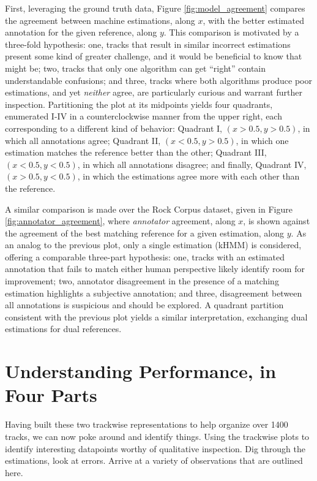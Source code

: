 \documentclass{article}
\begin{document}
First, leveraging the ground truth data, Figure \ref{fig:model_agreement} compares the agreement between machine estimations, along $x$, with the better estimated annotation for the given reference, along $y$.
This comparison is motivated by a three-fold hypothesis:
one, tracks that result in similar incorrect estimations present some kind of greater challenge, and it would be beneficial to know that might be;
two, tracks that only one algorithm can get ``right'' contain understandable confusions;
and three, tracks where both algorithms produce poor estimations, and yet \emph{neither} agree, are particularly curious and warrant further inspection.
Partitioning the plot at its midpoints yields four quadrants, enumerated I-IV in a counterclockwise manner from the upper right, each corresponding to a different kind of behavior:
Quadrant I, $(x > 0.5, y > 0.5)$, in which all annotations agree;
Quadrant II, $(x < 0.5, y > 0.5)$, in which one estimation matches the reference better than the other;
Quadrant III, $(x < 0.5, y < 0.5)$, in which all annotations disagree;
and finally, Quadrant IV, $(x > 0.5, y < 0.5)$, in which the estimations agree more with each other than the reference.

A similar comparison is made over the Rock Corpus dataset, given in Figure \ref{fig:annotator_agreement}, where \emph{annotator} agreement, along $x$, is shown against the agreement of the best matching reference for a given estimation, along $y$.
As an analog to the previous plot, only a single estimation (kHMM) is considered, offering a comparable three-part hypothesis:
one, tracks with an estimated annotation that fails to match either human perspective likely identify room for improvement;
two, annotator disagreement in the presence of a matching estimation highlights a subjective annotation;
and three, disagreement between all annotations is suspicious and should be explored.
A quadrant partition consistent with the previous plot yields a similar interpretation, exchanging dual estimations for dual references.



\section{Understanding Performance, in Four Parts}
\label{sec:data_analysis}

Having built these two trackwise representations to help organize over 1400 tracks, we can now poke around and identify things.
Using the trackwise plots to identify interesting datapoints worthy of qualitative inspection.
Dig through the estimations, look at errors.
Arrive at a variety of observations that are outlined here.
\end{document}
